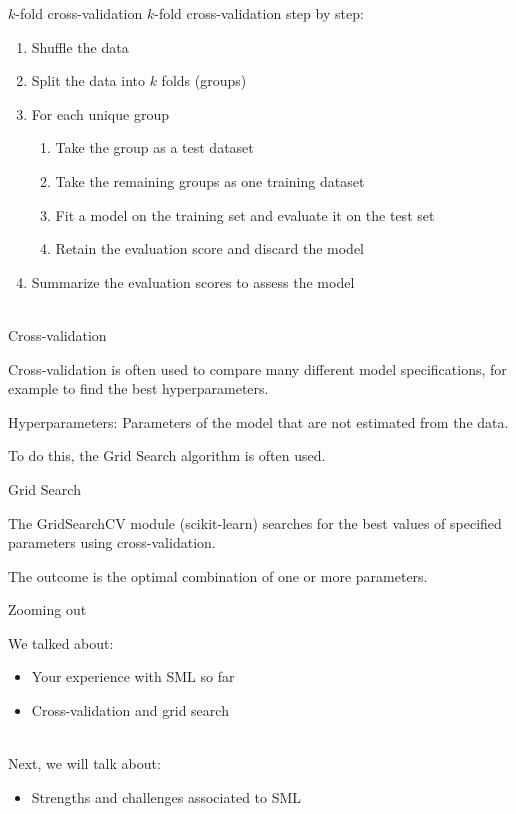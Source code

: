 \documentclass[handout]{beamer}
\begin{document}
\begin{frame}{\(k\)-fold cross-validation}
	\(k\)-fold cross-validation step by step:
	\begin{enumerate}
		\item Shuffle the data
		\item Split the data into \(k\) folds (groups)
		\item For each unique group
		\begin{enumerate}
			\item Take the group as a test dataset
			\item Take the remaining groups as one training dataset
			\item Fit a model on the training set and evaluate it on the test set
			\item Retain the evaluation score and discard the model
		\end{enumerate}
		\item Summarize the evaluation scores to assess the model \\\
	\end{enumerate}

\end{frame}
	

\begin{frame}{Cross-validation}
	
	Cross-validation is often used to compare many different model specifications, for example to find the best hyperparameters.
	
	Hyperparameters: Parameters of the model that are not estimated from the data. 
	
	To do this, the Grid Search algorithm is often used.
	
\end{frame}


\begin{frame}{Grid Search}
	
The GridSearchCV module (scikit-learn) searches for the best values of specified parameters using cross-validation.

The outcome is the optimal combination of one or more parameters.
	
\end{frame}



\begin{frame}{Zooming out} 
	
	We talked about:
	\begin{itemize}
		\item Your experience with SML so far
		\item Cross-validation and grid search \\\
	\end{itemize}
	
	Next, we will talk about:
	\begin{itemize}
		\item Strengths and challenges associated to SML
	\end{itemize}
	
\end{frame}
\end{document}
